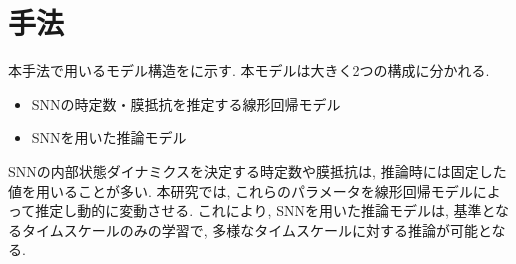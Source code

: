 \section{手法}

本手法で用いるモデル構造をに示す.
本モデルは大きく2つの構成に分かれる.
\begin{itemize}
    \item SNNの時定数・膜抵抗を推定する線形回帰モデル
    \item SNNを用いた推論モデル
\end{itemize}
SNNの内部状態ダイナミクスを決定する時定数や膜抵抗は, 推論時には固定した値を用いることが多い\cite{zheng2024temporal}\cite{ParametricSNN}.
本研究では, これらのパラメータを線形回帰モデルによって推定し動的に変動させる.
これにより, SNNを用いた推論モデルは, 基準となるタイムスケールのみの学習で, 多様なタイムスケールに対する推論が可能となる.




